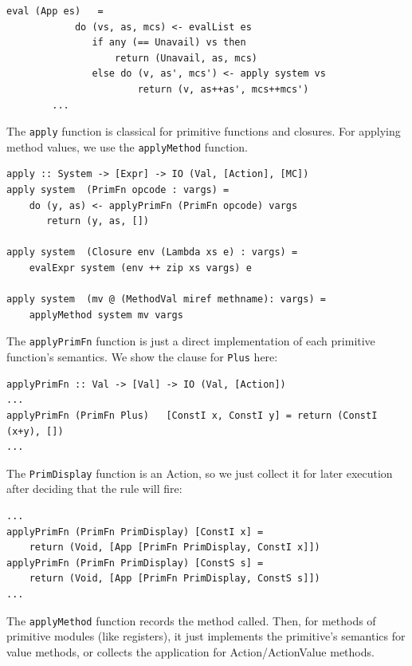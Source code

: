 \documentclass[11pt]{article}
\newcommand{\term}[1]{\texttt{#1}}
\begin{document}
\begin{Verbatim}[frame=single, commandchars=\\\{\}]
        eval (App es)   =
            do (vs, as, mcs) <- evalList es
               if any (== Unavail) vs then
                   return (Unavail, as, mcs)
               else do (v, as', mcs') <- apply system vs
                       return (v, as++as', mcs++mcs')
        ...
\end{Verbatim}

The \term{apply} function is classical for primitive functions and
closures.  For applying method values, we use the \term{applyMethod}
function.

\begin{Verbatim}[frame=single, commandchars=\\\{\}]
apply :: System -> [Expr] -> IO (Val, [Action], [MC])
apply system  (PrimFn opcode : vargs) =
    do (y, as) <- applyPrimFn (PrimFn opcode) vargs
       return (y, as, [])

apply system  (Closure env (Lambda xs e) : vargs) =
    evalExpr system (env ++ zip xs vargs) e

apply system  (mv @ (MethodVal miref methname): vargs) =
    applyMethod system mv vargs
\end{Verbatim}

The \term{applyPrimFn} function is just a direct implementation of
each primitive function's semantics.  We show the clause for \term{Plus} here:

\begin{Verbatim}[frame=single, commandchars=\\\{\}]
applyPrimFn :: Val -> [Val] -> IO (Val, [Action])
...
applyPrimFn (PrimFn Plus)   [ConstI x, ConstI y] = return (ConstI (x+y), [])
...
\end{Verbatim}

The \term{PrimDisplay} function is an Action, so we just collect it
for later execution after deciding that the rule will fire:

\begin{Verbatim}[frame=single, commandchars=\\\{\}]
...
applyPrimFn (PrimFn PrimDisplay) [ConstI x] =
    return (Void, [App [PrimFn PrimDisplay, ConstI x]])
applyPrimFn (PrimFn PrimDisplay) [ConstS s] =
    return (Void, [App [PrimFn PrimDisplay, ConstS s]])
...
\end{Verbatim}

The \term{applyMethod} function records the method called.  Then, for
methods of primitive modules (like registers), it just implements the
primitive's semantics for value methods, or collects the application
for Action/ActionValue methods.
\end{document}

